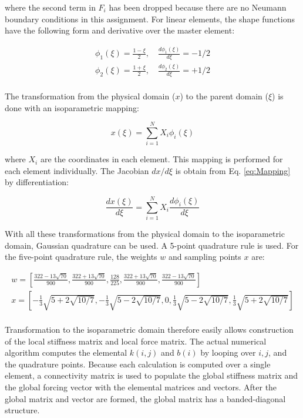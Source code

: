 \documentclass[10pt]{article}
\begin{document}
where the second term in \(F_i\) has been dropped because there are no Neumann boundary conditions in this assignment. For linear elements, the shape functions have the following form and derivative over the master element:

\begin{equation}
\begin{aligned}
\phi_1(\xi)=\frac{1-\xi}{2},\quad\frac{d\phi_1(\xi)}{d\xi}=-1/2\\
\phi_2(\xi)=\frac{1+\xi}{2}, \quad\frac{d\phi_2(\xi)}{d\xi}=+1/2\\
\end{aligned}
\end{equation}

The transformation from the physical domain (\(x\)) to the parent domain (\(\xi\)) is done with an isoparametric mapping:

\begin{equation}
\label{eq:Mapping}
x(\xi)=\sum_{i=1}^{N} X_i\phi_i(\xi)
\end{equation}

where \(X_i\) are the coordinates in each element. This mapping is performed for each element individually. The Jacobian \(dx/d\xi\) is obtain from Eq. \eqref{eq:Mapping} by differentiation:

\begin{equation}
\frac{dx(\xi)}{d\xi}=\sum_{i=1}^{N} X_i\frac{d\phi_i(\xi)}{d\xi}
\end{equation}

With all these transformations from the physical domain to the isoparametric domain, Gaussian quadrature can be used. A 5-point quadrature rule is used. For the five-point quadrature rule, the weights \(w\) and sampling points \(x\) are:

\begin{equation}
\begin{aligned}
w=\left\lbrack\frac{322-13\sqrt{70}}{900}, \frac{322+13\sqrt{70}}{900}, \frac{128}{225}, \frac{322+13\sqrt{70}}{900}, \frac{322-13\sqrt{70}}{900}\right\rbrack\\
x=\left\lbrack-\frac{1}{3}\sqrt{5+2\sqrt{10/7}}, -\frac{1}{3}\sqrt{5-2\sqrt{10/7}}, 0, \frac{1}{3}\sqrt{5-2\sqrt{10/7}}, \frac{1}{3}\sqrt{5+2\sqrt{10/7}}\right\rbrack\\
\end{aligned}
\end{equation} 

Transformation to the isoparametric domain therefore easily allows construction of the local stiffness matrix and local force matrix. The actual numerical algorithm computes the elemental \(k(i,j)\) and \(b(i)\) by looping over \(i, j\), and the quadrature points. Because each calculation is computed over a single element, a connectivity matrix is used to populate the global stiffness matrix and the global forcing vector with the elemental matrices and vectors. After the global matrix and vector are formed, the global matrix has a banded-diagonal structure. 
\end{document}

